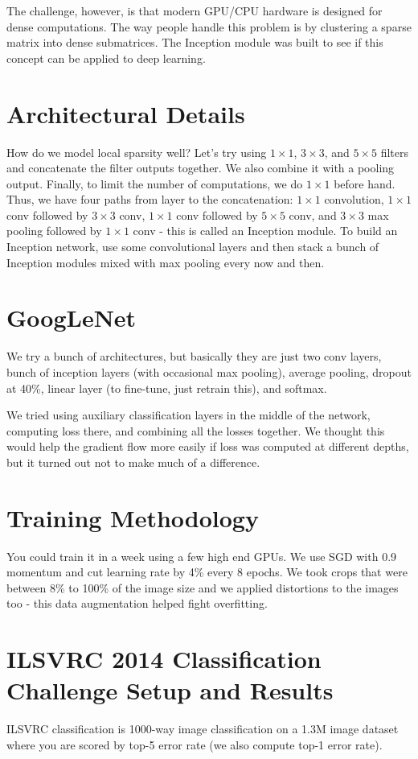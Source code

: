 \documentclass[a4paper]{article}
\begin{document}
The challenge, however, is that modern GPU/CPU hardware is designed for dense
computations. The way people handle this problem is by clustering a sparse
matrix into dense submatrices. The Inception module was built to see if this
concept can be applied to deep learning.

\section{Architectural Details}
How do we model local sparsity well? Let's try using $1 \times 1$, $3 \times 3$,
and $5 \times 5$ filters and concatenate the filter outputs together. We also
combine it with a pooling output. Finally, to limit the number of computations,
we do $1 \times 1$ before hand. Thus, we have four paths from layer to the 
concatenation: $1 \times 1$ convolution, $1 \times 1$ conv followed by 
$3 \times 3$ conv, $1 \times 1$ conv followed by $5 \times 5$ conv, and $3
\times 3$ max pooling followed by $1 \times 1$ conv - this is called an 
Inception module. To build an Inception network, use some convolutional
layers and then stack a bunch of Inception modules mixed with max pooling
every now and then.

\section{GoogLeNet}
We try a bunch of architectures, but basically they are just two conv layers,
bunch of inception layers (with occasional max pooling), average pooling,
dropout at 40\%, linear layer (to fine-tune, just retrain this), and softmax.

We tried using auxiliary classification layers in the middle of the network,
computing loss there, and combining all the losses together. We thought this
would help the gradient flow more easily if loss was computed at different
depths, but it turned out not to make much of a difference.

\section{Training Methodology}
You could train it in a week using a few high end GPUs. We use SGD with 0.9
momentum and cut learning rate by 4\% every 8 epochs. We took crops that
were between 8\% to 100\% of the image size and we applied distortions to
the images too - this data augmentation helped fight overfitting.

\section{ILSVRC 2014 Classification Challenge Setup and Results}
ILSVRC classification is 1000-way image classification on a 1.3M image dataset
where you are scored by top-5 error rate (we also compute top-1 error rate).
\end{document}
